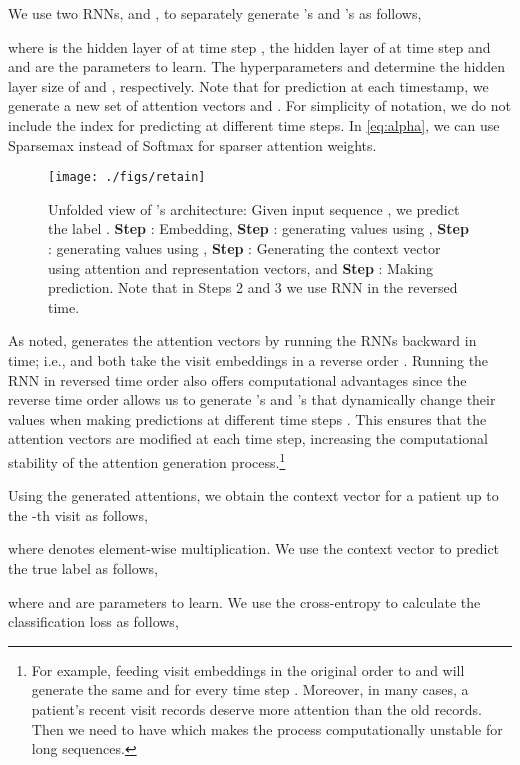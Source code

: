 We use two RNNs,  and , to separately generate 's and 's as follows,

where  is the hidden layer of  at time step ,  the hidden layer of  at time step  and  and  are the parameters to learn. The hyperparameters  and  determine the hidden layer size of  and , respectively. Note that for prediction at each timestamp, we generate a new set of attention vectors  and . For simplicity of notation, we do not include the index for predicting at different time steps. 
In \ref{eq:alpha}, we can use Sparsemax \cite{martins2016softmax} instead of Softmax for sparser attention weights.

\begin{figure}[t]
\centering
\texttt{[image: ./figs/retain]}
\caption{Unfolded view of \alg's architecture: Given input sequence , we predict the label . 
\textbf{Step} : Embedding, 
\textbf{Step} : generating  values using , 
\textbf{Step} : generating  values using , 
\textbf{Step} : Generating the context vector using attention and representation vectors, and 
\textbf{Step} : Making prediction.
Note that in Steps 2 and 3 we use RNN in the reversed time.}
\label{fig:architecture}
\end{figure}



As noted, \alg generates the attention vectors by running the RNNs backward in time;  i.e.,  and  both take the visit embeddings in a reverse order . Running the RNN in reversed time order also offers computational advantages since the reverse time order allows us to generate 's and 's that dynamically change their values when making predictions at different time steps .
This ensures that the attention vectors are modified at each time step, increasing the computational stability of the attention generation process.\footnote{For example, feeding visit embeddings in the original order to  and  will generate the same  and  for every time step . Moreover, in many cases, a patient's recent visit records deserve more attention than the old records. Then we need to have  which makes the process computationally unstable for long sequences.} 


Using the generated attentions, we obtain the context vector  for a patient up to the -th visit as follows,

where  denotes element-wise multiplication. We use the context vector  to predict the true label  as follows,

where  and  are parameters to learn. We use the cross-entropy to calculate the classification loss as follows, 

